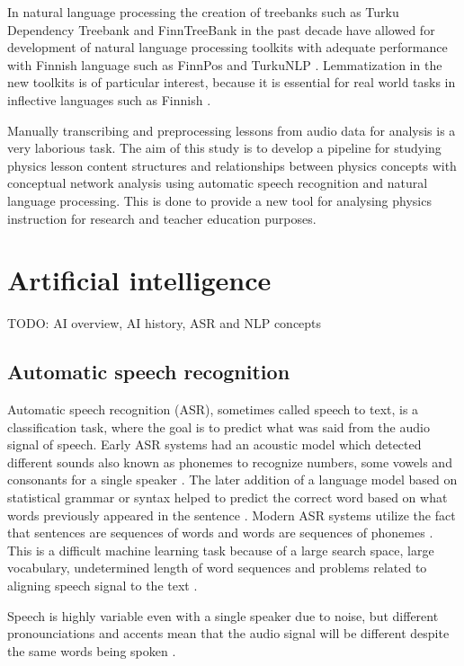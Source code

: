 \documentclass[utf8,english]{gradu3}
\begin{document}
In natural language processing the creation of treebanks such as Turku Dependency Treebank and FinnTreeBank in the past decade have allowed for development of natural language processing toolkits with adequate performance with Finnish language such as FinnPos \parencite{silfverberg2016finnpos} and TurkuNLP \parencite{kanerva2018turku}. Lemmatization in the new toolkits is of particular interest, because it is essential for real world tasks in inflective languages such as Finnish \parencite{kanerva2018turku}.

Manually transcribing and preprocessing lessons from audio data for analysis is a very laborious task. The aim of this study is to develop a pipeline for studying physics lesson content structures and relationships between physics concepts with conceptual network analysis using automatic speech recognition and natural language processing. This is done to provide a new tool for analysing physics instruction for research and teacher education purposes. 

\chapter{Artificial intelligence}
TODO: AI overview, AI history, ASR and NLP concepts

\section{Automatic speech recognition}
Automatic speech recognition (ASR), sometimes called speech to text, is a classification task, where the goal is to predict what was said from the audio signal of speech. Early ASR systems had an acoustic model which detected different sounds also known as phonemes to recognize numbers, some vowels and consonants for a single speaker \parencite{juang2005automatic}. The later addition of a language model based on statistical grammar or syntax helped to predict the correct word based on what words previously appeared in the sentence \parencite{juang2005automatic}. Modern ASR systems utilize the fact that sentences are sequences of words and words are sequences of phonemes \parencite{bengio2014word}. This is a difficult machine learning task because of a large search space, large vocabulary, undetermined length of word sequences and problems related to aligning speech signal to the text \parencite{enarvi2018modeling}.

Speech is highly variable even with a single speaker due to noise, but different pronounciations and accents mean that the audio signal will be different despite the same words being spoken \parencite{juang2005automatic}. 
\end{document}
